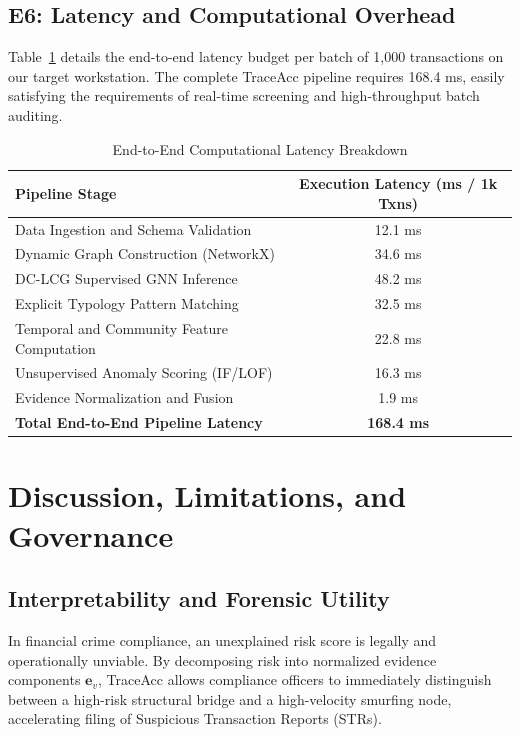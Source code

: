 \documentclass[journal]{IEEEtran}
\begin{document}
\subsection{E6: Latency and Computational Overhead}
Table~\ref{tab:latency} details the end-to-end latency budget per batch of 1,000 transactions on our target workstation. The complete TraceAcc pipeline requires 168.4 ms, easily satisfying the requirements of real-time screening and high-throughput batch auditing.

\begin{table}[t]
\centering
\caption{End-to-End Computational Latency Breakdown}
\label{tab:latency}
\begin{tabular}{lc}
\toprule
\textbf{Pipeline Stage} & \textbf{Execution Latency (ms / 1k Txns)} \\
\midrule
Data Ingestion and Schema Validation & 12.1 ms \\
Dynamic Graph Construction (NetworkX) & 34.6 ms \\
DC-LCG Supervised GNN Inference & 48.2 ms \\
Explicit Typology Pattern Matching & 32.5 ms \\
Temporal and Community Feature Computation & 22.8 ms \\
Unsupervised Anomaly Scoring (IF/LOF) & 16.3 ms \\
Evidence Normalization and Fusion & 1.9 ms \\
\midrule
\textbf{Total End-to-End Pipeline Latency} & \textbf{168.4 ms} \\
\bottomrule
\end{tabular}
\end{table}

\section{Discussion, Limitations, and Governance}

\subsection{Interpretability and Forensic Utility}
In financial crime compliance, an unexplained risk score is legally and operationally unviable. By decomposing risk into normalized evidence components $\mathbf{e}_v$, TraceAcc allows compliance officers to immediately distinguish between a high-risk structural bridge and a high-velocity smurfing node, accelerating filing of Suspicious Transaction Reports (STRs).
\end{document}
